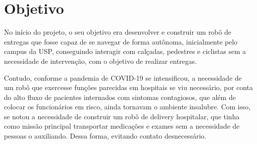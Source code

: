 \documentclass[../poliXuniversity_hospital_-USP-report.tex]{subfiles}
\begin{document}
\chapter{Objetivo}
No início do projeto, o seu objetivo era desenvolver e construir um robô de entregas que fosse capaz de se navegar de forma autônoma, inicialmente pelo campus da USP, conseguindo interagir com calçadas, pedestres e ciclistas sem a necessidade de intervenção, com o objetivo de realizar entregas. 

Contudo, conforme a pandemia de COVID-19 \cite{covid2020} se intensificou, a necessidade de um robô que exercesse funções parecidas em hospitais se viu necessário, por conta do alto fluxo de pacientes internados com sintomas contagiosos, que além de colocar os funcionários em risco, ainda tornavam o ambiente insalubre. Com isso, se notou a necessidade de construir um robô de delivery hospitalar, que tinha como missão principal transportar medicações e exames sem a necessidade de pessoas o auxiliando. Dessa forma, evitando contato desnecessário. 
\end{document}
